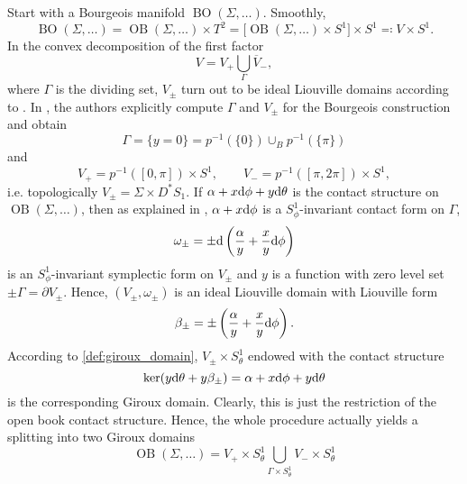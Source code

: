 Start with a Bourgeois manifold $\operatorname{BO}(\Sigma,\dots)$.
Smoothly,
\[
    \operatorname{BO}(\Sigma,\dots) = \operatorname{OB}(\Sigma, \dots) \times T^2 
    = \big[\operatorname{OB}(\Sigma, \dots) \times S^1\big] \times S^1 
    \eqqcolon V \times S^1.
\]
In the convex decomposition of the first factor
\[
    V = V_+ \bigcup_\Gamma \overline{V}_-,
\]
where $\Gamma$ is the dividing set, $V_\pm$ turn out to be ideal Liouville domains according to \cite[Section 6]{DG12}.
In \cite[Section 5.3]{DG12}, the authors explicitly compute $\Gamma$ and 
$V_\pm$ for the Bourgeois construction and obtain %
\[
    \Gamma = \{y = 0\} = p^{-1}(\{0\}) \cup_B p^{-1}(\{\pi\})
\]
and
\[
    V_+ = p^{-1}([0, \pi]) \times S^1, \qquad V_- = p^{-1}([\pi, 2\pi]) \times S^1,
\]
i.e. topologically $V_\pm = \Sigma \times D^*S_1$.
If $\alpha + x \mathrm{d} \phi + y \mathrm{d} \theta$ is the contact structure on $\operatorname{OB}(\Sigma, \dots)$,
then as explained in \cite[Section 5.3]{DG12}, $\alpha + x \mathrm{d} \phi$ is a 
$S^1_\phi$-invariant contact form on $\Gamma$,
\[
    \omega_\pm = \pm \mathrm{d} \left(\frac{\alpha}{y} + \frac{x}{y}\mathrm{d} \phi\right) 
\]
is an $S^1_\phi$-invariant symplectic form on $V_\pm$ and
$y$ is a function with zero level set $\pm \Gamma = \partial V_\pm$.
Hence, $(V_\pm, \omega_\pm)$ is an ideal Liouville domain with Liouville form
\[
    \beta_\pm = \pm \left(\frac{\alpha}{y} + \frac{x}{y}\mathrm{d} \phi\right).
\]
According to \cref{def:giroux_domain}, $V_\pm \times S^1_\theta$
endowed with the contact structure 
\[
    \ker(y \mathrm{d} \theta + y \beta_\pm) = \alpha + x \mathrm{d} \phi + y \mathrm{d} \theta
\]
is the corresponding Giroux domain. Clearly, this is just the restriction
of the open book contact structure. Hence, the whole procedure actually yields a
splitting into two Giroux domains
\[
    \operatorname{OB}(\Sigma, \dots) = V_+ \times S^1_\theta 
    \bigcup_{\Gamma \times S^1_\theta} V_- \times S^1_\theta
\]